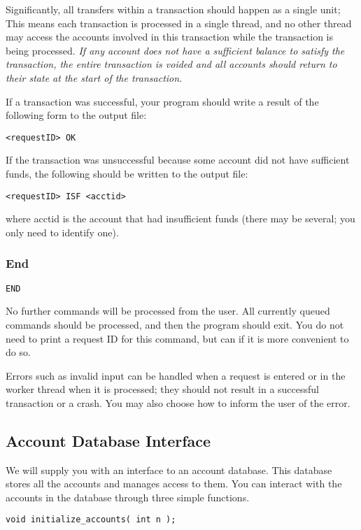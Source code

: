 \documentclass[letterpaper,10pt]{article}
\begin{document}
Significantly, all transfers within a transaction should happen as a single unit; This means each
transaction is processed in a single thread, and no other thread may access the accounts involved in this
transaction while the transaction is being processed. \emph{If any account does not have a sufficient balance to
satisfy the transaction, the entire transaction is voided and all accounts should return to their state at the
start of the transaction.}

If a transaction was successful, your program should write a result of the following form to the output file:
\begin{verbatim}
<requestID> OK
\end{verbatim}

If the transaction was unsuccessful because some account did not have sufficient funds, the following
should be written to the output file:
\begin{verbatim}
<requestID> ISF <acctid>
\end{verbatim}
where acctid is the account that had insufficient funds (there may be several; you only need to identify
one).


\subsubsection{End}
\begin{verbatim}
END
\end{verbatim}
No further commands will be processed from the user. All currently queued commands should
be processed, and then the program should exit. You do not need to print a request ID
for this command, but can if it is more convenient to do so.

Errors such as invalid input can be handled when a request is entered or in the worker thread when
it is processed; they should not result in a successful transaction or a crash. You may also choose how to
inform the user of the error.


\subsection{Account Database Interface}

We will supply you with an interface to an account database. This database stores all the accounts
and manages access to them. You can interact with the accounts in the database through three simple
functions.
\begin{verbatim}
void initialize_accounts( int n );
\end{verbatim}
\end{document}

